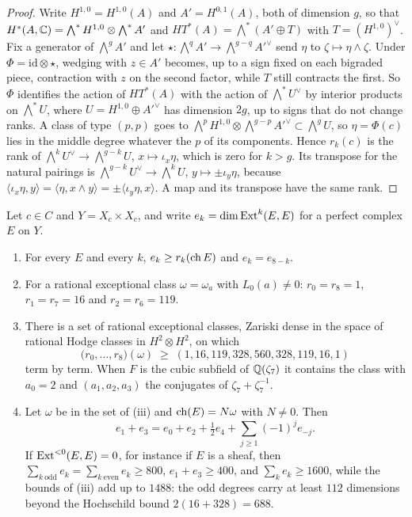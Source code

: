 \begin{proof}
Write $H^{1,0}=H^{1,0}(A)$ and $A'=H^{0,1}(A)$, both of dimension $g$, so
that $H^{*}(A,\mathbb{C})=\bigwedge^{*}H^{1,0}\otimes\bigwedge^{*}A'$ and
$HT^{*}(A)=\bigwedge^{*}(A'\oplus T)$ with $T=(H^{1,0})^{\vee}$. Fix a
generator of $\bigwedge^{g}A'$ and let
$\star\colon\bigwedge^{q}A'\to\bigwedge^{g-q}A'^{\vee}$ send $\eta$ to
$\zeta\mapsto\eta\wedge\zeta$. Under $\Phi=\mathrm{id}\otimes\star$, wedging
with $z\in A'$ becomes, up to a sign fixed on each bigraded piece, contraction
with $z$ on the second factor, while $T$ still contracts the first. So $\Phi$
identifies the action of $HT^{*}(A)$ with the action of
$\bigwedge^{*}U^{\vee}$ by interior products on $\bigwedge^{*}U$, where
$U=H^{1,0}\oplus A'^{\vee}$ has dimension $2g$, up to signs that do not change
ranks. A class of type $(p,p)$ goes to
$\bigwedge^{p}H^{1,0}\otimes\bigwedge^{g-p}A'^{\vee}\subset\bigwedge^{g}U$,
so $\eta=\Phi(c)$ lies in the middle degree whatever the $p$ of its
components. Hence $r_{k}(c)$ is the rank of
$\bigwedge^{k}U^{\vee}\to\bigwedge^{g-k}U$, $x\mapsto\iota_{x}\eta$, which is
zero for $k>g$. Its transpose for the natural pairings is
$\bigwedge^{g-k}U^{\vee}\to\bigwedge^{k}U$, $y\mapsto\pm\iota_{y}\eta$,
because $\langle\iota_{x}\eta,y\rangle=\langle\eta,x\wedge y\rangle
=\pm\langle\iota_{y}\eta,x\rangle$. A map and its transpose have the same
rank.
\end{proof}

\begin{theorem}\label{thm:mumfordprofile}
Let $c\in C$ and $Y=X_{c}\times X_{c}$, and write
$e_{k}=\dim\operatorname{Ext}^{k}(E,E)$ for a perfect complex $E$ on $Y$.
\begin{enumerate}[label=\textup{(\roman*)},leftmargin=2.6em,itemsep=2pt]
\item For every $E$ and every $k$, $e_{k}\ge r_{k}(\operatorname{ch} E)$ and
  $e_{k}=e_{8-k}$.
\item For a rational exceptional class $\omega=\omega_{a}$ with
  $L_{0}(a)\ne0$: $r_{0}=r_{8}=1$, $r_{1}=r_{7}=16$ and $r_{2}=r_{6}=119$.
\item There is a set of rational exceptional classes, Zariski dense in the
  space of rational Hodge classes in $H^{2}\otimes H^{2}$, on which
  \[
    \bigl(r_{0},\dots,r_{8}\bigr)(\omega)\;\ge\;
    (1,16,119,328,560,328,119,16,1)
  \]
  term by term. When $F$ is the cubic subfield of $\mathbb{Q}(\zeta_{7})$ it contains
  the class with $a_{0}=2$ and $(a_{1},a_{2},a_{3})$ the conjugates of
  $\zeta_{7}+\zeta_{7}^{-1}$.
\item Let $\omega$ be in the set of (iii) and $\operatorname{ch}(E)=N\omega$ with $N\ne0$.
  Then
  \[
    e_{1}+e_{3}=e_{0}+e_{2}+\tfrac12e_{4}
      +\sum_{j\ge1}(-1)^{j}e_{-j}.
  \]
  If $\operatorname{Ext}^{<0}(E,E)=0$, for instance if $E$ is a sheaf, then
  $\sum_{k\ \mathrm{odd}}e_{k}=\sum_{k\ \mathrm{even}}e_{k}\ge800$,
  $e_{1}+e_{3}\ge400$, and $\sum_{k}e_{k}\ge1600$, while the bounds of
  (iii) add up to $1488$: the odd degrees carry at least $112$ dimensions
  beyond the Hochschild bound $2(16+328)=688$.
\end{enumerate}
\end{theorem}

